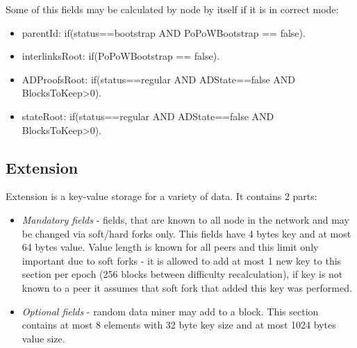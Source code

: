 \vspace{1em}
Some of this fields may be calculated by node by itself if it is in correct mode:

\begin{itemize}
    \item parentId: if(status==bootstrap AND PoPoWBootstrap == false).
    \item interlinksRoot: if(PoPoWBootstrap == false).
    \item ADProofsRoot: if(status==regular AND ADState==false AND BlocksToKeep>0).
    \item stateRoot: if(status==regular AND ADState==false AND BlocksToKeep>0).
\end{itemize}

\subsection{Extension}

Extension is a key-value storage for a variety of data.
It contains 2 parts:
\begin{itemize}
    \item{\em Mandatory fields } - fields, that are known to all node in the network and may be changed
    via soft/hard forks only. This fields have 4 bytes key and at most 64 bytes value.
    Value length is known for all peers and this limit only important due to soft forks -
    it is allowed to add at most 1 new key to this section per epoch (256 blocks between
    difficulty recalculation), if key is not known to a peer it assumes that soft fork that
    added this key was performed.
    \item{\em Optional fields } - random data miner may add to a block. This section contains at most 8
    elements with 32 byte key size and at most 1024 bytes value size.
\end{itemize}

